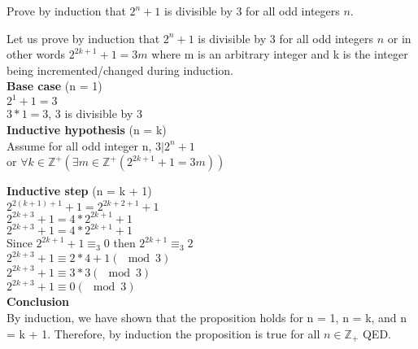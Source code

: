 \documentclass[solution,letterpaper]{cs20}
\begin{document}
    \newpage

    \begin{problem}
        Prove by induction that $2^n + 1$ is divisible by 3 for all odd integers $n$.

        \begin{solution}
            Let us prove by induction that $2^n + 1$ is divisible by 3 for all odd integers $n$ or
            in other words $2^{2k + 1} + 1 = 3m$ where m is an arbitrary integer and k is the integer being incremented/changed during induction. \\

            \textbf{Base case} (n = 1) \\
            $2^1 + 1 = 3$ \\
            $3 * 1 = 3$, 3 is divisible by 3 \\

            \textbf{Inductive hypothesis} (n = k) \\
            Assume for all odd integer n, $3 \vert 2^n + 1$ \\
            or $\forall k \in \mathbb{Z}^{+} (\exists m \in \mathbb{Z}^{+}(2^{2k + 1} + 1 = 3m))$

            \textbf{Inductive step} (n = k + 1) \\
            $2^{2(k+1) + 1} + 1 = 2^{2k + 2 + 1} + 1$ \\
            $2^{2k + 3} + 1 = 4 * 2^{2k+ 1} + 1$ \\
            $2^{2k + 3} + 1 = 4 * 2^{2k+1} + 1$ \\
            Since $2^{2k + 1} + 1 \equiv_3 0$ then $2^{2k + 1} \equiv_3 2$ \\
            $2^{2k + 3} + 1 \equiv 2 * 4 + 1 (\mod 3)$ \\
            $2^{2k + 3} + 1 \equiv 3 * 3 (\mod 3)$ \\
            $2^{2k + 3} + 1 \equiv 0 (\mod 3)$ \\

            \textbf{Conclusion} \\
            By induction, we have shown that the proposition holds for n = 1, n = k, and n = k + 1. Therefore, by induction the proposition is true for all $n \in \mathbb{Z}_+$ QED. \\
        \end{solution}
    \end{problem}


    \newpage
\end{document}
